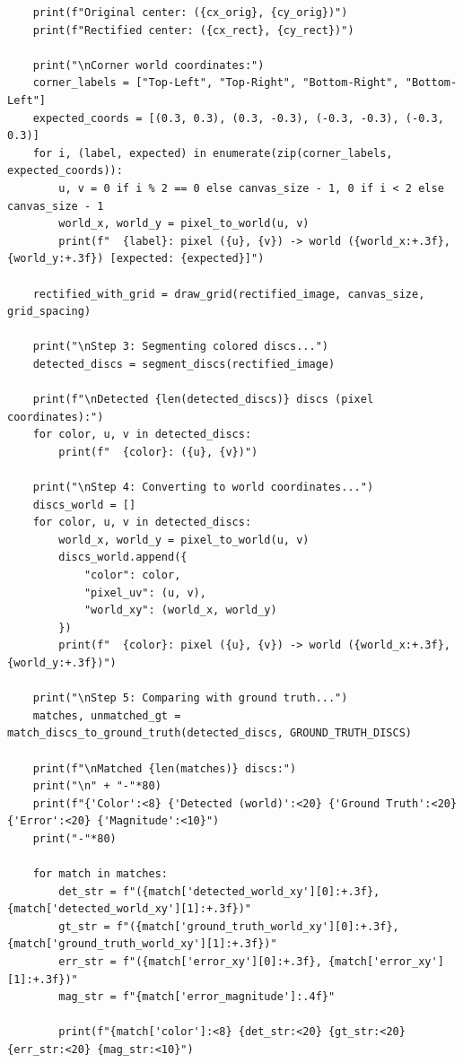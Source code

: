 \documentclass{article}
\begin{document}
\begin{latin}
\begin{LTR}
\begin{verbatim}
    print(f"Original center: ({cx_orig}, {cy_orig})")
    print(f"Rectified center: ({cx_rect}, {cy_rect})")
    
    print("\nCorner world coordinates:")
    corner_labels = ["Top-Left", "Top-Right", "Bottom-Right", "Bottom-Left"]
    expected_coords = [(0.3, 0.3), (0.3, -0.3), (-0.3, -0.3), (-0.3, 0.3)]
    for i, (label, expected) in enumerate(zip(corner_labels, expected_coords)):
        u, v = 0 if i % 2 == 0 else canvas_size - 1, 0 if i < 2 else canvas_size - 1
        world_x, world_y = pixel_to_world(u, v)
        print(f"  {label}: pixel ({u}, {v}) -> world ({world_x:+.3f}, {world_y:+.3f}) [expected: {expected}]")
    
    rectified_with_grid = draw_grid(rectified_image, canvas_size, grid_spacing)
    
    print("\nStep 3: Segmenting colored discs...")
    detected_discs = segment_discs(rectified_image)
    
    print(f"\nDetected {len(detected_discs)} discs (pixel coordinates):")
    for color, u, v in detected_discs:
        print(f"  {color}: ({u}, {v})")
    
    print("\nStep 4: Converting to world coordinates...")
    discs_world = []
    for color, u, v in detected_discs:
        world_x, world_y = pixel_to_world(u, v)
        discs_world.append({
            "color": color,
            "pixel_uv": (u, v),
            "world_xy": (world_x, world_y)
        })
        print(f"  {color}: pixel ({u}, {v}) -> world ({world_x:+.3f}, {world_y:+.3f})")
    
    print("\nStep 5: Comparing with ground truth...")
    matches, unmatched_gt = match_discs_to_ground_truth(detected_discs, GROUND_TRUTH_DISCS)
    
    print(f"\nMatched {len(matches)} discs:")
    print("\n" + "-"*80)
    print(f"{'Color':<8} {'Detected (world)':<20} {'Ground Truth':<20} {'Error':<20} {'Magnitude':<10}")
    print("-"*80)
    
    for match in matches:
        det_str = f"({match['detected_world_xy'][0]:+.3f}, {match['detected_world_xy'][1]:+.3f})"
        gt_str = f"({match['ground_truth_world_xy'][0]:+.3f}, {match['ground_truth_world_xy'][1]:+.3f})"
        err_str = f"({match['error_xy'][0]:+.3f}, {match['error_xy'][1]:+.3f})"
        mag_str = f"{match['error_magnitude']:.4f}"
        
        print(f"{match['color']:<8} {det_str:<20} {gt_str:<20} {err_str:<20} {mag_str:<10}")
    

\end{verbatim}
\end{LTR}
\end{latin}
\end{document}
